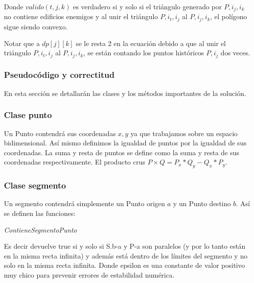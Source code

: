 Donde $valido(t,j,k)$ es verdadero si y solo si el triángulo generado por $P, i_j, i_k$ no contiene edificios enemigos
y al unir el triángulo $P, i_t, i_j$ al $P, i_j, i_k$, el polígono sigue siendo convexo.

Notar que a $dp[j][k]$ se le resta 2 en la ecuación debido a que al unir el triángulo $P, i_t, i_j$ al $P, i_j, i_k$,
se están contando los puntos históricos $P, i_j$ dos veces.

\subsubsection{Pseudocódigo y correctitud}

En esta sección se detallarán las clases y los métodos importantes de la solución.

\subsubsection*{Clase punto}

Un Punto contendrá sus coordenadas $x,y$ ya que trabajamos sobre un espacio bidimensional. Así mismo definimos
la igualdad de puntos por la igualdad de sus coordenadas. La suma y resta de puntos se define como la suma y resta
de sus coordenadas respectivamente. El producto crus $P \times Q = P_x * Q_y - Q_x * P_y$.

\subsubsection*{Clase segmento}

Un segmento contendrá simplemente un Punto origen $a$ y un Punto destino $b$. Así se definen las funciones:

\begin{algorithm}[H]
	\caption{\textit{ContieneSegmentoPunto}}
\end{algorithm}

Es decir devuelve true si y solo si S.b-a y P-a son paralelos (y por lo tanto están en la misma recta infinita)
y además está dentro de los límites del segmento y no solo en la misma recta infinita.
Donde epsilon es una constante de valor positivo muy chico para prevenir errores de estabilidad numérica.

